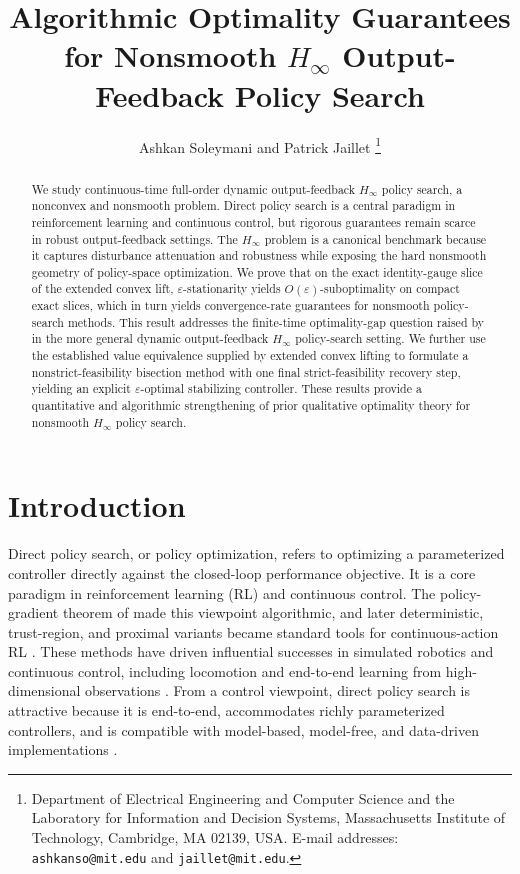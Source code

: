 \documentclass[letterpaper,10pt,conference]{ieeeconf}
\title{\LARGE\bf
Algorithmic Optimality Guarantees for Nonsmooth $H_\infty$ Output-Feedback Policy Search}
\author{Ashkan Soleymani and Patrick Jaillet%
\thanks{Department of Electrical Engineering and Computer Science and the Laboratory for Information and Decision Systems, Massachusetts Institute of Technology, Cambridge, MA 02139, USA. E-mail addresses: {\tt\small ashkanso@mit.edu} and {\tt\small jaillet@mit.edu}.}}
\renewcommand{\^}[1]{^{(#1)}}
\begin{document}
\maketitle
\thispagestyle{empty}
\pagestyle{empty}

\begin{abstract}
We study continuous-time full-order dynamic output-feedback $H_\infty$ policy search, a nonconvex and nonsmooth problem. Direct policy search is a central paradigm in reinforcement learning and continuous control, but rigorous guarantees remain scarce in robust output-feedback settings. The $H_\infty$ problem is a canonical benchmark because it captures disturbance attenuation and robustness while exposing the hard nonsmooth geometry of policy-space optimization. We prove that on the exact identity-gauge slice of the extended convex lift, $\varepsilon$-stationarity yields $O(\varepsilon)$-suboptimality on compact exact slices, which in turn yields convergence-rate guarantees for nonsmooth policy-search methods. This result addresses the finite-time optimality-gap question raised by \citet{guo2022global} in the more general dynamic output-feedback $H_\infty$ policy-search setting. We further use the established value equivalence supplied by extended convex lifting to formulate a nonstrict-feasibility bisection method with one final strict-feasibility recovery step, yielding an explicit $\varepsilon$-optimal stabilizing controller. These results provide a quantitative and algorithmic strengthening of prior qualitative optimality theory for nonsmooth $H_\infty$ policy search.
\end{abstract}


\vspace{-0.15cm}
\section{Introduction}
Direct policy search, or policy optimization, refers to optimizing a parameterized controller directly against the closed-loop performance objective. It is a core paradigm in reinforcement learning (RL) and continuous control. The policy-gradient theorem of \citet{sutton1999policy} made this viewpoint algorithmic, and later deterministic, trust-region, and proximal variants became standard tools for continuous-action RL \citep{silver2014deterministic,schulman2015trust,schulman2017proximal}. These methods have driven influential successes in simulated robotics and continuous control, including locomotion and end-to-end learning from high-dimensional observations \citep{lillicrap2015continuous,recht2019tour}. From a control viewpoint, direct policy search is attractive because it is end-to-end, accommodates richly parameterized controllers, and is compatible with model-based, model-free, and data-driven implementations \citep{fazel2018global,zhang2021policy}.
\end{document}
